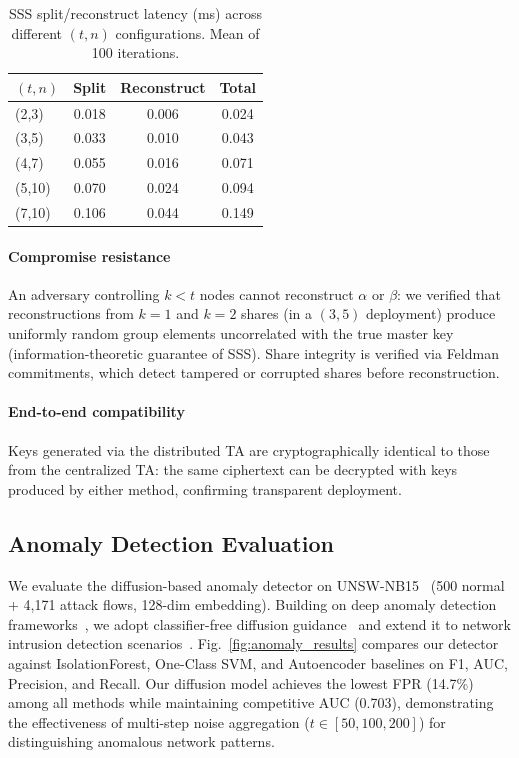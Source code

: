 \documentclass[lettersize,journal]{IEEEtran}
\begin{document}
\begin{table}[t]
    \centering
    \caption{SSS split/reconstruct latency (ms) across different $(t,n)$
    configurations. Mean of 100 iterations.}
    \label{tab:dta_perf}
    \footnotesize
    \begin{tabular}{lccc}
    \toprule
    $(t,n)$ & Split & Reconstruct & Total \\
    \midrule
    (2,3) & 0.018 & 0.006 & 0.024 \\
    (3,5) & 0.033 & 0.010 & 0.043 \\
    (4,7) & 0.055 & 0.016 & 0.071 \\
    (5,10) & 0.070 & 0.024 & 0.094 \\
    (7,10) & 0.106 & 0.044 & 0.149 \\
    \bottomrule
    \end{tabular}
\end{table}

\paragraph{Compromise resistance}
An adversary controlling $k < t$ nodes cannot reconstruct $\alpha$ or
$\beta$: we verified that reconstructions from $k=1$ and $k=2$ shares
(in a $(3,5)$ deployment) produce uniformly random group elements
uncorrelated with the true master key (information-theoretic guarantee
of SSS). Share integrity is verified via Feldman commitments, which detect
tampered or corrupted shares before reconstruction.

\paragraph{End-to-end compatibility}
Keys generated via the distributed TA are cryptographically identical
to those from the centralized TA: the same ciphertext can be decrypted
with keys produced by either method, confirming transparent deployment.

\subsection{Anomaly Detection Evaluation}
\label{subsec:anomaly}

We evaluate the diffusion-based anomaly detector on UNSW-NB15~\cite{UNSWNB15} (500 normal + 4,171 attack flows, 128-dim embedding). Building on deep anomaly detection frameworks~\cite{Pang2021_AnomalySurvey}, we adopt classifier-free diffusion guidance~\cite{CFG2022} and extend it to network intrusion detection scenarios~\cite{Tang2023}. Fig.~\ref{fig:anomaly_results} compares our detector against IsolationForest, One-Class SVM, and Autoencoder baselines on F1, AUC, Precision, and Recall. Our diffusion model achieves the lowest FPR (14.7\%) among all methods while maintaining competitive AUC (0.703), demonstrating the effectiveness of multi-step noise aggregation ($t\in[50,100,200]$) for distinguishing anomalous network patterns.
\end{document}
